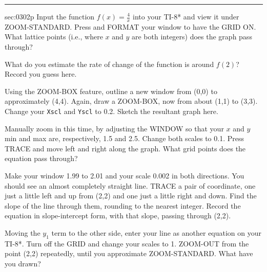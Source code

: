\renewcommand{\columnseprule}{1.5pt}
\begin{multicols*}{2}
\rule[0.5\baselineskip]{0.4\textwidth}{1pt}
\noindent
{}\label{sec:0302p}
\begin{exercises}{sec:0302p}
\lab{} Input the function $f(x)=\frac{4}{x}$ into your TI-8* and view
it under ZOOM-STANDARD.  Press \Touche[style=second]
\Touche[style=function,principal={zoom}] and FORMAT your
window to have the GRID ON.  What lattice points (i.e., where
$x$ and $y$ are both integers) does the graph pass through?

\vspace{2cm}
\lab{} What do you estimate the rate of change of the function is around 
$f(2)$? Record you guess here.

\vspace{1cm}
\lab[] Using the ZOOM-BOX feature, outline a new window from (0,0) to
approximately (4,4).  Again, draw a ZOOM-BOX, now from about  (1,1)
to (3,3).  Change your \texttt{Xscl} and \texttt{Yscl} to 0.2.  Sketch the 
resultant graph here.

\begin{center}
\end{center}
  
\lab Manually zoom in this time, by adjusting the WINDOW so that your
$x$ and $y$ min and max are, respectively, 1.5 and 2.5.  Change both scales
to 0.1.  Press TRACE and move left and right along the graph.  What 
grid points does the equation pass through?  

\vspace{3cm}
\lab  Make your window 1.99 to 2.01 and your scale 0.002 in both directions.
You should see an almost completely straight line.  TRACE a pair of coordinate,
one just a little left and up from (2,2) and one just a little right and down.  Find
the slope of the line through them, rounding to the nearest integer.  
Record the equation in slope-intercept form,
with that slope, passing through (2,2).

\vspace{3cm}
\lab{} Moving the $y_1$ term to the other side, enter your line as another equation
on your TI-8*.  Turn off the GRID and change your scales to 1.  ZOOM-OUT
from the point (2,2) repeatedly, until you approximate ZOOM-STANDARD.
What have you drawn?


\end{exercises}
\end{multicols*}
